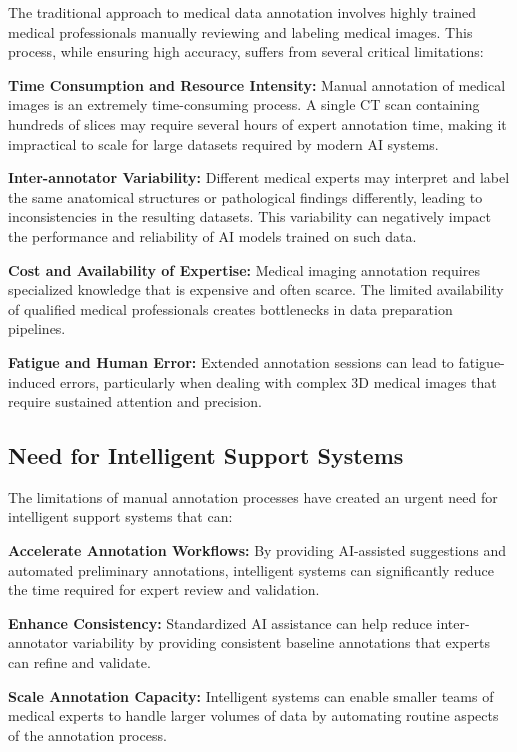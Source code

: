 The traditional approach to medical data annotation involves highly trained medical professionals manually reviewing and labeling medical images. This process, while ensuring high accuracy, suffers from several critical limitations:

\textbf{Time Consumption and Resource Intensity:} Manual annotation of medical images is an extremely time-consuming process. A single CT scan containing hundreds of slices may require several hours of expert annotation time, making it impractical to scale for large datasets required by modern AI systems.

\textbf{Inter-annotator Variability:} Different medical experts may interpret and label the same anatomical structures or pathological findings differently, leading to inconsistencies in the resulting datasets. This variability can negatively impact the performance and reliability of AI models trained on such data.

\textbf{Cost and Availability of Expertise:} Medical imaging annotation requires specialized knowledge that is expensive and often scarce. The limited availability of qualified medical professionals creates bottlenecks in data preparation pipelines.

\textbf{Fatigue and Human Error:} Extended annotation sessions can lead to fatigue-induced errors, particularly when dealing with complex 3D medical images that require sustained attention and precision.

\subsection{Need for Intelligent Support Systems}

The limitations of manual annotation processes have created an urgent need for intelligent support systems that can:

\textbf{Accelerate Annotation Workflows:} By providing AI-assisted suggestions and automated preliminary annotations, intelligent systems can significantly reduce the time required for expert review and validation.

\textbf{Enhance Consistency:} Standardized AI assistance can help reduce inter-annotator variability by providing consistent baseline annotations that experts can refine and validate.

\textbf{Scale Annotation Capacity:} Intelligent systems can enable smaller teams of medical experts to handle larger volumes of data by automating routine aspects of the annotation process.

